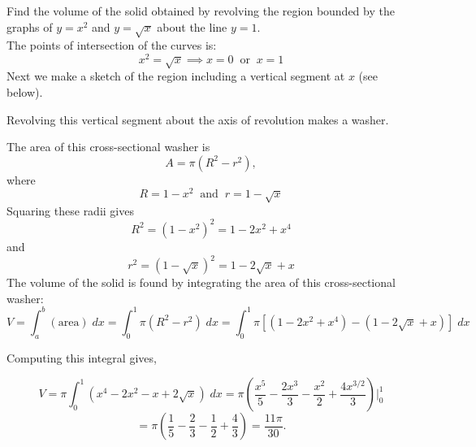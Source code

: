 \documentclass{ximera}
\begin{document}
\begin{example}[example 6] Find the volume of the solid obtained by revolving the region bounded by the graphs of 
$y = x^2$ and $y = \sqrt x$ about the line $y = 1$.\\
The points of intersection of the curves is:
\[
x^2 = \sqrt x \implies x = 0 \;\; \text{or} \;\; x=1\]
Next we make a sketch of the region including a vertical segment at $x$ (see below).

Revolving this vertical segment about the axis of revolution makes a washer.

The area of this cross-sectional washer is
\[
A = \pi(R^2 -r^2),
\]
where 
\[
R = 1-x^2 \;\; \text{and} \;\; r = 1 - \sqrt x
\]
Squaring these radii gives
\[
R^2 = (1-x^2)^2 = 1 - 2x^2 + x^4
\]
and
\[
r^2 = (1-\sqrt x)^2 = 1 - 2\sqrt x + x
\]
The volume of the solid is found by integrating the area of this cross-sectional washer:
\[
V = \int_a^b (\text{area}) \; dx = \int_0^1 \pi(R^2 -r^2) \; dx = \int_0^1 \pi [(1-2x^2 + x^4) - (1-2\sqrt x + x)] \; dx
\]

Computing this integral gives,

\[
V = \pi \int_0^1 (x^4 -2x^2 - x + 2\sqrt x) \; dx = \pi \left(\frac{x^5}{5} - \frac{2x^3}{3} - \frac{x^2}{2} + \frac{4x^{3/2}}{3} \right) \bigg|_0^1
\]
\[
= \pi \left(\frac15 -\frac23 - \frac12 + \frac43 \right) = \frac{11\pi}{30}.
\]




\begin{image}
\end{image}
\end{example}
\end{document}

